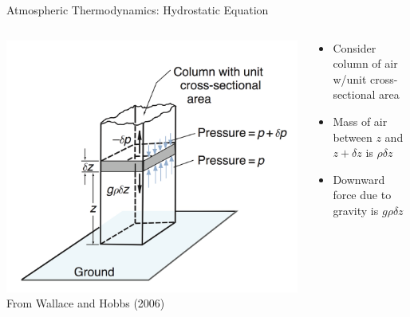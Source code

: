\begin{frame}{Atmospheric Thermodynamics: Hydrostatic Equation}
\begin{columns}[T]
    \begin{column}{.5\textwidth}
    \begin{minipage}[c][0.8\textheight][c]{\linewidth}
    \includegraphics[width=1\textwidth]{fig1.png}\\
    \centering \small From Wallace and Hobbs (2006)
    \end{minipage}
    \end{column}
    \begin{column}{.5\textwidth}
    \begin{minipage}[c][0.8\textheight][c]{\linewidth}
   \begin{itemize}
   	\item Consider column of air w/unit cross-sectional area
   	\item Mass of air between $z$ and $z+\delta z$ is $\rho \delta z$
   	\item Downward force due to gravity is $g\rho \delta z$
   \end{itemize}
      \end{minipage}
    \end{column}
  \end{columns} 
\end{frame}
